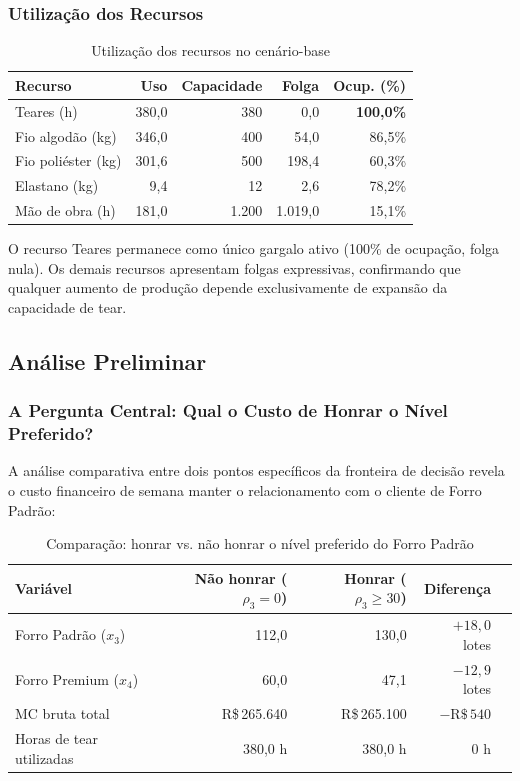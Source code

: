 \subsubsection{Utilização dos Recursos}

\begin{table}[H]
\centering
\caption{Utilização dos recursos no cenário-base}
\label{tab:util_base}
\begin{tabular}{lrrrr}
\toprule
\textbf{Recurso} & \textbf{Uso} & \textbf{Capacidade} & \textbf{Folga} & \textbf{Ocup. (\%)} \\
\midrule
Teares (h)            & 380,0  & 380   &   0,0   & \textbf{100,0\%} \\
Fio algodão (kg)      & 346,0  & 400   &  54,0   & 86,5\% \\
Fio poliéster (kg)    & 301,6  & 500   & 198,4   & 60,3\% \\
Elastano (kg)         &  9,4   &  12   &   2,6   & 78,2\% \\
Mão de obra (h)       & 181,0  & 1.200 & 1.019,0 & 15,1\% \\
\bottomrule
\end{tabular}
\end{table}

O recurso Teares permanece como único gargalo ativo (100\% de ocupação, folga nula).
Os demais recursos apresentam folgas expressivas, confirmando que qualquer aumento
de produção depende exclusivamente de expansão da capacidade de tear.

\newpage

\subsection{Análise Preliminar}
\label{sec:analise_r2}

\subsubsection{A Pergunta Central: Qual o Custo de Honrar o Nível Preferido?}

A análise comparativa entre dois pontos específicos da fronteira de decisão
revela o custo financeiro de semana manter o relacionamento com o cliente de
Forro Padrão:

\begin{table}[H]
\centering
\caption{Comparação: honrar vs. não honrar o nível preferido do Forro Padrão}
\label{tab:comparacao_pref}
\begin{tabular}{lrrrr}
\toprule
\textbf{Variável} & \textbf{Não honrar ($\rho_3 = 0$)} & \textbf{Honrar ($\rho_3 \geq 30$)} & \textbf{Diferença} \\
\midrule
Forro Padrão ($x_3$)   & 112,0 & 130,0 & $+18,0$ lotes \\
Forro Premium ($x_4$)  &  60,0 &  47,1 & $-12,9$ lotes \\
MC bruta total         & R\$\,265.640 & R\$\,265.100 & $-\text{R\$}\,540$ \\
Horas de tear utilizadas & 380,0 h & 380,0 h & 0 h \\
\bottomrule
\end{tabular}
\end{table}

